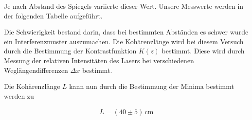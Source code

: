Je nach Abstand des Spiegels variierte dieser Wert. Unsere Messwerte werden in der folgenden Tabelle aufgeführt.

Die Schwierigkeit bestand darin, dass bei bestimmten Abständen es schwer wurde ein Interferenzmuster auszumachen.
Die Kohärenzlänge wird bei diesem Versuch durch die Bestimmung der Kontrastfunktion $K(z)$ bestimmt. Diese wird durch Messung der relativen Intensitäten des Lasers bei verschiedenen Weglängendifferenzen $\Delta x$ bestimmt.


Die Kohärenzlänge $L$ kann nun durch die Bestimmung der Minima bestimmt werden zu

\begin{align}
L = (40 \pm 5)\, \text{cm}
\end{align}
